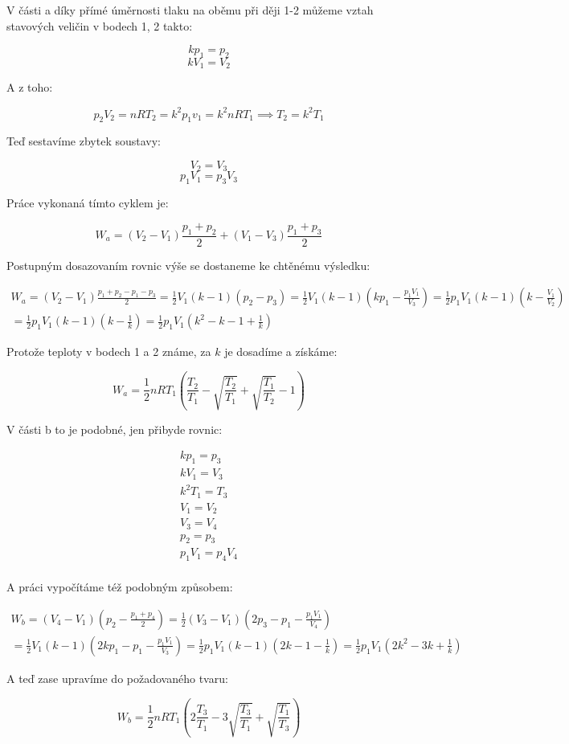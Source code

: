 \documentclass{fkssolpub}
\author{Ondřej Sedláček}
\begin{document}
 

V části a díky přímé úměrnosti tlaku na oběmu při ději 1-2 můžeme
vztah stavových veličin v bodech 1, 2 takto:

\[
  k p_1 = p_2
\]
\[
  k V_1 = V_2
\]

A z toho:

\[
  p_2 V_2 = n R T_2 = k^2 p_1 v_1 = k^2 n R T_1 \implies T_2 = k^2 T_1
\]

Teď sestavíme zbytek soustavy:

\[
  V_2 = V_3
\]
\[
  p_1 V_1 = p_3 V_3
\]

Práce vykonaná tímto cyklem je:

\[
  W_a = (V_2 - V_1) \frac{p_1 + p_2}{2} + (V_1 - V_3) \frac{p_1 + p_3}{2}
\]

Postupným dosazovaním rovnic výše se dostaneme ke chtěnému výsledku:

\begin{gather*}
  W_a = (V_2 - V_1) \frac{p_1 + p_2 - p_1 - p_3}{2} 
      = \frac{1}{2} V_1 (k - 1) (p_2 - p_3) 
      = \frac{1}{2} V_1 (k - 1) \left(k p_1 - \frac{p_1 V_1}{V_3}\right)
      = \frac{1}{2} p_1 V_1 (k - 1) \left(k - \frac{V_1}{V_2}\right) \\
      = \frac{1}{2} p_1 V_1 (k - 1) \left(k - \frac{1}{k}\right)
      = \frac{1}{2} p_1 V_1 \left(k^2 - k - 1 + \frac{1}{k}\right)
\end{gather*}

Protože teploty v bodech 1 a 2 známe, za $k$ je dosadíme a získáme:

\[
  W_a = \frac{1}{2} n R T_1 \left(\frac{T_2}{T_1} - \sqrt{\frac{T_2}{T_1}} + \sqrt{\frac{T_1}{T_2}} - 1\right)
\]

V části b to je podobné, jen přibyde rovnic:

\begin{gather*}
  k p_1 = p_3 \\
  k V_1 = V_3 \\
  k^2 T_1 = T_3 \\
  V_1 = V_2 \\
  V_3 = V_4 \\
  p_2 = p_3 \\
  p_1 V_1 = p_4 V_4 \\
\end{gather*}

A práci vypočítáme též podobným způsobem:

\begin{gather*}
  W_b = (V_4 - V_1) \left(p_2 - \frac{p_1 + p_4}{2}\right) 
      = \frac{1}{2} (V_3 - V_1) \left(2p_3 - p_1 - \frac{p_1 V_1}{V_4} \right) \\
      = \frac{1}{2} V_1 (k - 1) \left(2k p_1 - p_1 - \frac{p_1 V_1}{V_3} \right)
      = \frac{1}{2} p_1 V_1 (k - 1) \left(2k - 1 - \frac{1}{k} \right)
      = \frac{1}{2} p_1 V_1 \left(2k^2 - 3k + \frac{1}{k} \right)
\end{gather*}

A teď zase upravíme do požadovaného tvaru:

\[
  W_b = \frac{1}{2} n R T_1 \left(2 \frac{T_3}{T_1} - 3 \sqrt{\frac{T_3}{T_1}} + \sqrt{\frac{T_1}{T_3}} \right)
\]
\end{document}
